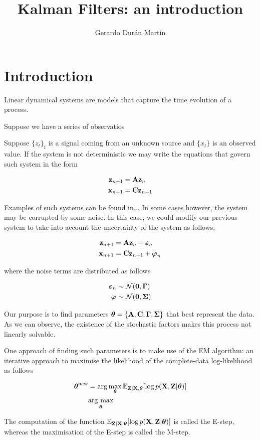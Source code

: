 \documentclass[11pt]{article}
\title{Kalman Filters: an introduction}
\author{Gerardo Durán Martín}
\newcommand{\argmax}[1]{\underset{#1}{\operatorname{arg}\,\operatorname{max}}\;}
\begin{document}
\maketitle

\section{Introduction}
Linear dynamical systems are models that capture the time evolution of a process.

Suppose we have a series of observatios

Suppose $\{z_t\}_t$ is a signal coming from an unknown source and $\{x_t\}$ is an observed value. If the system is not deterministic we may write the equations that govern such system in the form

\begin{align*}
	{\bf z}_{n+1} &= {\bf A} {\bf z}_{n}\\
	{\bf x}_{n+1} &= {\bf C} {\bf z}_{n+1}
\end{align*}

Examples of such systems can be found in... In some cases however, the system may be corrupted by some noise. In this case, we could modify our previous system to take into account the uncertainty of the system as follows:

\begin{align*}
	{\bf z}_{n+1} &= {\bf A} {\bf z}_{n} + \boldsymbol\varepsilon_n\\
	{\bf x}_{n+1} &= {\bf C} {\bf z}_{n+1} + \boldsymbol\varphi_n
\end{align*}

where the noise terms are distributed as follows

\begin{align}
	\boldsymbol\varepsilon_n &\sim \mathcal{N}({\bf 0}, \boldsymbol\Gamma)\\
	\boldsymbol\varphi & \sim \mathcal{N}({\bf 0}, \boldsymbol\Sigma)
\end{align}

Our purpose is to find parameters $\boldsymbol\theta = \{{\bf A}, {\bf C}, \boldsymbol\Gamma, \boldsymbol\Sigma\}$ that best represent the data. As we can observe, the existence of the stochastic factors makes this process not linearly solvable.



One approach of finding such parameters is to make use of the EM algorithm: an iterative approach to maximise the likelihood of the complete-data log-likelihood as follows

\begin{align}
	\boldsymbol{\theta}^\text{new} &= \arg\max_{\boldsymbol{\theta}} \mathbb{E}_{{\bf Z}\vert {\bf X}, \boldsymbol{\theta}}[\log p({\bf X}, {\bf Z}\vert \boldsymbol\theta)]\\
	&\argmax{\boldsymbol{\theta}}
\end{align}

The computation of the function $\mathbb{E}_{{\bf Z}\vert {\bf X}, \boldsymbol{\theta}}[\log p({\bf X}, {\bf Z}\vert \boldsymbol\theta)]$ is called the E-step, whereas the maximisation of the E-step is called the M-step. 
\end{document}
